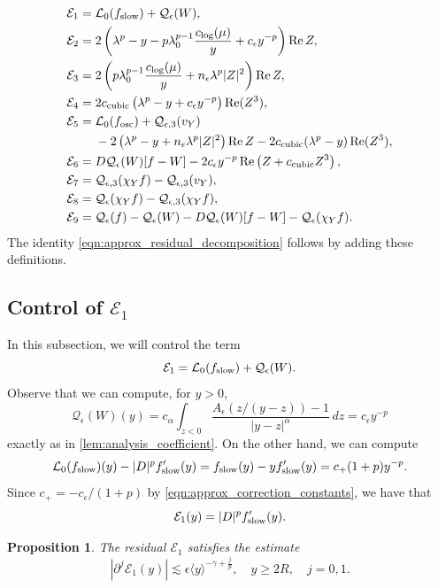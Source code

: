 \documentclass[11pt]{amsart}
\newtheorem{proposition}[theorem]{Proposition}
\theoremstyle{definition}
\theoremstyle{remark}
\numberwithin{equation}{section}
\newcommand{\mc}[1]{\mathcal{#1}}
\newcommand{\ang}[1]{\langle #1 \rangle}
\begin{document}
\begin{align}
    \mc{E}_1={}&\mc{L}_0(f_{\textup{slow}})+\mc{Q}_\epsilon(W),
        \label{eqn:approx_E1}\\
    \mc{E}_2={}&2\left(\lambda^p-y-p\lambda_0^{p-1}\frac{c_{\textup{log}}(\mu)}{y}
        +c_\epsilon y^{-p}\right)\operatorname{Re}Z,
        \label{eqn:approx_E2}\\
    \mc{E}_3={}&2\left(p\lambda_0^{p-1}\frac{c_{\textup{log}}(\mu)}{y}
        +n_\epsilon\lambda^p|Z|^2\right)\operatorname{Re}Z,
        \label{eqn:approx_E3}\\
    \mc{E}_4={}&2c_{\textup{cubic}}\left(\lambda^p-y+c_\epsilon y^{-p}\right)
        \operatorname{Re}(Z^3),
        \label{eqn:approx_E4}\\
    \mc{E}_5={}&\mc{L}_0(f_{\textup{osc}})+\mc{Q}_{\epsilon,3}(v_Y)\notag\\*
        &-2\left(\lambda^p-y+n_\epsilon\lambda^p|Z|^2\right)\operatorname{Re}Z
        -2c_{\textup{cubic}}(\lambda^p-y)\operatorname{Re}(Z^3),
        \label{eqn:approx_E5}\\
    \mc{E}_6={}&D\mc{Q}_\epsilon(W)[f-W]
        -2c_\epsilon y^{-p}\operatorname{Re}\left(Z+c_{\textup{cubic}}Z^3\right),
        \label{eqn:approx_E6}\\
    \mc{E}_7={}&\mc{Q}_{\epsilon,3}(\chi_Y f)-\mc{Q}_{\epsilon,3}(v_Y),
        \label{eqn:approx_E7}\\
    \mc{E}_8={}&\mc{Q}_\epsilon(\chi_Y f)-\mc{Q}_{\epsilon,3}(\chi_Y f),
        \label{eqn:approx_E8}\\
    \mc{E}_9={}&\mc{Q}_\epsilon(f)-\mc{Q}_\epsilon(W)
        -D\mc{Q}_\epsilon(W)[f-W]-\mc{Q}_\epsilon(\chi_Y f).
        \label{eqn:approx_E9}
\end{align}
\endgroup
The identity \eqref{eqn:approx_residual_decomposition} follows by adding these definitions. 

\subsection{Control of \texorpdfstring{$\mc{E}_1$}{E1}}
In this subsection, we will control the term 
\[\mc{E}_1 = \mc{L}_0(f_{\textup{slow}}) + \mc{Q}_\epsilon(W).\] Observe that we can compute, for $y > 0$, 
\[\mc{Q}_\epsilon(W)(y) =  c_\alpha\int_{z < 0}\frac{A_\epsilon(z/(y-z)) - 1}{|y - z|^\alpha} \, dz = c_\epsilon y^{-p}\]
exactly as in \cref{lem:analysis_coefficient}. On the other hand, we can compute
\[\mc{L}_0(f_{\textup{slow}})(y) -|D|^p f_{\textup{slow}}'(y) = f_{\textup{slow}}(y) - y f_{\textup{slow}}'(y) = c_+(1 + p)y^{-p}.\]
Since $c_+ = -c_\epsilon / (1 + p)$ by \eqref{eqn:approx_correction_constants}, we have that
\[\mc{E}_1(y) = |D|^p f_{\textup{slow}}'(y).\]
\begin{proposition}\label{prop:approx_E1}
    The residual $\mc{E}_1$ satisfies the estimate
    \[|\partial^j \mc{E}_1(y)| \lesssim \epsilon \ang{y}^{-\gamma + \frac{j}{p}}, \quad y \geq 2R, \quad j = 0,1.\]
\end{proposition}
\end{document}
